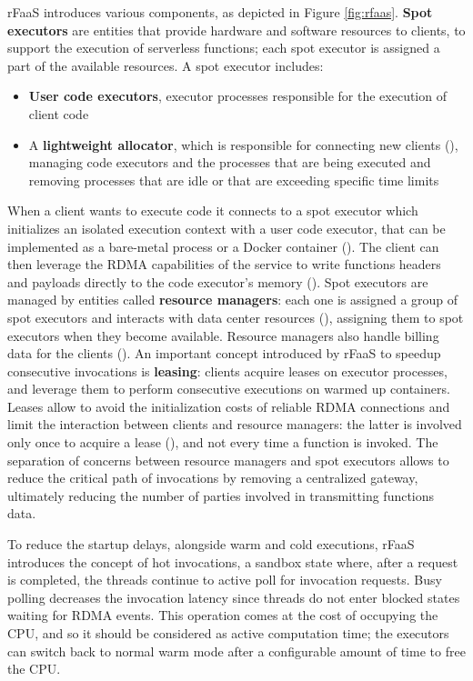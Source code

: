 \documentclass[
	a4paper, %
	12pt,
	twoside, %
]{LTJournalArticle}
\DeclareRobustCommand*\circledColorSmall[2]{\tikz[baseline=(char.base)]{
    \node[shape=circle,fill=#2,draw=#2,inner sep=0pt] (char) {\textcolor{white}{\footnotesize\textbf{#1}}};}}
\begin{document}
rFaaS introduces various components, as depicted in Figure \ref{fig:rfaas}. \textbf{Spot executors} are entities that provide hardware and software resources to clients, to support the execution of serverless functions; each spot executor is assigned a part of the available resources.
A spot executor includes:
\begin{itemize}
	\item \textbf{User code executors}, executor processes responsible for the execution of client code
	\item A \textbf{lightweight allocator}, which is responsible for connecting new clients (\circledColorSmall{A2}{brown}), managing code executors and the processes that are being executed and removing processes that are idle or that are exceeding specific time limits
\end{itemize}
When a client wants to execute code it connects to a spot executor which initializes an isolated execution context with a user code executor, that can be implemented as a bare-metal process or a Docker container (\circledColorSmall{D1}{brown}). The client can then leverage the RDMA capabilities of the service to write functions headers and payloads directly to the code executor's memory (\circledColorSmall{D2}{brown}). Spot executors are managed by entities called \textbf{resource managers}: each one is assigned a group of spot executors and interacts with data center resources (\circledColorSmall{C}{brown}), assigning them to spot executors when they become available. Resource managers also handle billing data for the clients (\circledColorSmall{B}{brown}). An important concept introduced by rFaaS to speedup consecutive invocations is \textbf{leasing}: clients acquire leases on executor processes, and leverage them to perform consecutive executions on warmed up containers. Leases allow to avoid the initialization costs of reliable RDMA connections and limit the interaction between clients and resource managers: the latter is involved only once to acquire a lease (\circledColorSmall{A1}{brown}), and not every time a function is invoked. The separation of concerns between resource managers and spot executors allows to reduce the critical path of invocations by removing a centralized gateway, ultimately reducing the number of parties involved in transmitting functions data. 

To reduce the startup delays, alongside warm and cold executions, rFaaS introduces the concept of hot invocations, a sandbox state where, after a request is completed, the threads continue to active poll for invocation requests. Busy polling decreases the invocation latency since threads do not enter blocked states waiting for RDMA events. This operation comes at the cost of occupying the CPU, and so it should be considered as active computation time; the executors can switch back to normal warm mode after a configurable amount of time to free the CPU. 
\end{document}
